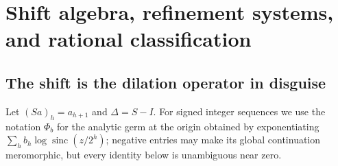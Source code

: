 \documentclass[11pt,oneside]{article}
\numberwithin{equation}{section}
\theoremstyle{definition}
\theoremstyle{remark}
\newcommand{\sinc}{\operatorname{sinc}}
\begin{document}
\section{Shift algebra, refinement systems, and rational classification}
\label{p1:sec:shift}

\subsection{The shift is the dilation operator in disguise}

Let $(Sa)_h=a_{h+1}$ and $\Delta=S-I$.  For signed integer sequences we use the notation
$\Phi_b$ for the analytic germ at the origin obtained by exponentiating
$\sum_hb_h\log\sinc(z/2^h)$; negative entries may make its global continuation
meromorphic, but every identity below is unambiguous near zero.
\end{document}
